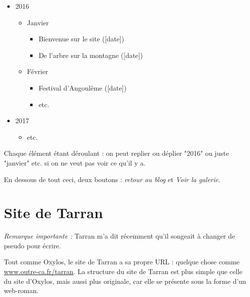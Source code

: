 \documentclass[french]{report}
\theoremstyle{plain}
\begin{document}
		\begin{itemize}
			\item 2016
			\begin{itemize}
				\item Janvier
				\begin{itemize}
					\item Bienvenue sur le site ([date])
					\item De l'arbre sur la montagne ([date])
				\end{itemize}
				\item Février
				\begin{itemize}
					\item Festival d'Angoulême ([date])
					\item etc.
				\end{itemize}
			\end{itemize}
			\item 2017
			\begin{itemize}
				\item etc.
			\end{itemize}
		\end{itemize}
		Chaque élément étant déroulant : on peut replier ou déplier "2016" ou juste "janvier" etc. si on ne veut pas voir ce qu'il y a.

		En dessous de tout ceci, deux boutons : \emph{retour au blog} et \emph{Voir la galerie}.

\chapter{Site de Tarran}
	\emph{Remarque importante :} Tarran m'a dit récemment qu'il songeait à changer de pseudo pour écrire.

	Tout comme Oxylos, le site de Tarran a sa propre URL : quelque chose comme \url{www.outre-ca.fr/tarran}. La structure du site de Tarran est plus simple que celle du site d'Oxylos, mais aussi plus originale, car elle se présente sous la forme d'un web-roman.
\end{document}
